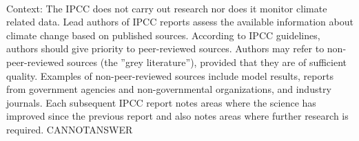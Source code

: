 \documentclass[11pt,a4paper, onecolumn]{article}
\begin{document}
\\ Context: The IPCC does not carry out research nor does it monitor climate related data. Lead authors of IPCC reports assess the available information about climate change based on published sources. According to IPCC guidelines, authors should give priority to peer-reviewed sources. Authors may refer to non-peer-reviewed sources (the ''grey literature''), provided that they are of sufficient quality. Examples of non-peer-reviewed sources include model results, reports from government agencies and non-governmental organizations, and industry journals. Each subsequent IPCC report notes areas where the science has improved since the previous report and also notes areas where further research is required. CANNOTANSWER
\end{document}
